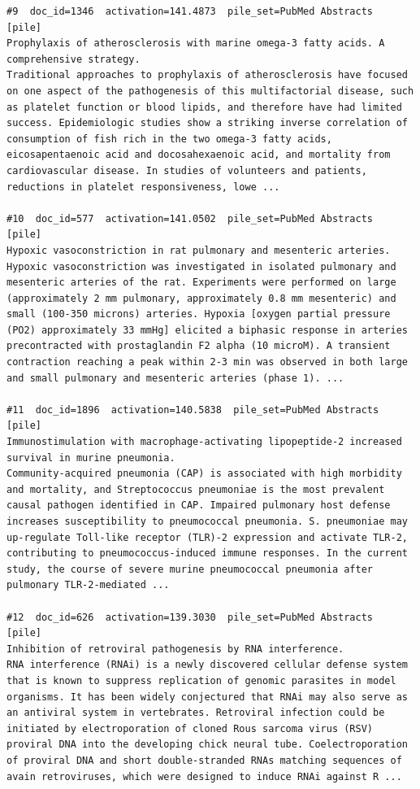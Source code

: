\begin{verbatim}
#9  doc_id=1346  activation=141.4873  pile_set=PubMed Abstracts  [pile]
Prophylaxis of atherosclerosis with marine omega-3 fatty acids. A comprehensive strategy.
Traditional approaches to prophylaxis of atherosclerosis have focused on one aspect of the pathogenesis of this multifactorial disease, such as platelet function or blood lipids, and therefore have had limited success. Epidemiologic studies show a striking inverse correlation of consumption of fish rich in the two omega-3 fatty acids, eicosapentaenoic acid and docosahexaenoic acid, and mortality from cardiovascular disease. In studies of volunteers and patients, reductions in platelet responsiveness, lowe ...

#10  doc_id=577  activation=141.0502  pile_set=PubMed Abstracts  [pile]
Hypoxic vasoconstriction in rat pulmonary and mesenteric arteries.
Hypoxic vasoconstriction was investigated in isolated pulmonary and mesenteric arteries of the rat. Experiments were performed on large (approximately 2 mm pulmonary, approximately 0.8 mm mesenteric) and small (100-350 microns) arteries. Hypoxia [oxygen partial pressure (PO2) approximately 33 mmHg] elicited a biphasic response in arteries precontracted with prostaglandin F2 alpha (10 microM). A transient contraction reaching a peak within 2-3 min was observed in both large and small pulmonary and mesenteric arteries (phase 1). ...

#11  doc_id=1896  activation=140.5838  pile_set=PubMed Abstracts  [pile]
Immunostimulation with macrophage-activating lipopeptide-2 increased survival in murine pneumonia.
Community-acquired pneumonia (CAP) is associated with high morbidity and mortality, and Streptococcus pneumoniae is the most prevalent causal pathogen identified in CAP. Impaired pulmonary host defense increases susceptibility to pneumococcal pneumonia. S. pneumoniae may up-regulate Toll-like receptor (TLR)-2 expression and activate TLR-2, contributing to pneumococcus-induced immune responses. In the current study, the course of severe murine pneumococcal pneumonia after pulmonary TLR-2-mediated ...

#12  doc_id=626  activation=139.3030  pile_set=PubMed Abstracts  [pile]
Inhibition of retroviral pathogenesis by RNA interference.
RNA interference (RNAi) is a newly discovered cellular defense system that is known to suppress replication of genomic parasites in model organisms. It has been widely conjectured that RNAi may also serve as an antiviral system in vertebrates. Retroviral infection could be initiated by electroporation of cloned Rous sarcoma virus (RSV) proviral DNA into the developing chick neural tube. Coelectroporation of proviral DNA and short double-stranded RNAs matching sequences of avain retroviruses, which were designed to induce RNAi against R ...


\end{verbatim}
